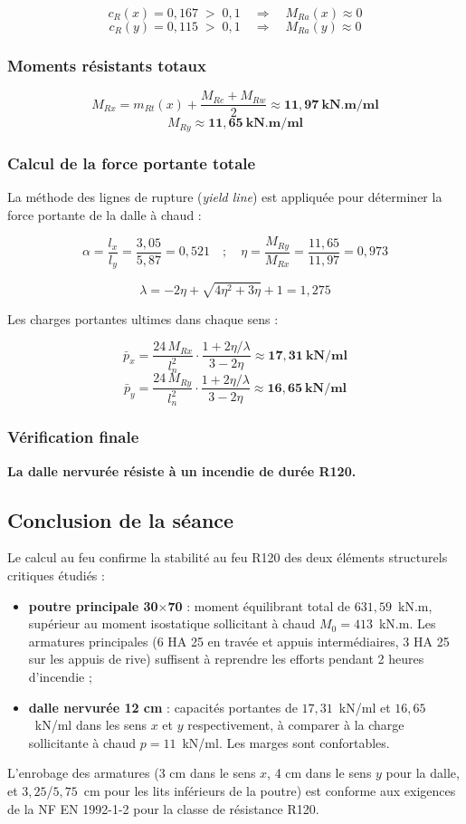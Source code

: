 \[
c_R(x) = 0{,}167 \;>\; 0{,}1 \quad\Longrightarrow\quad M_{Ra}(x) \approx 0
\]
\[
c_R(y) = 0{,}115 \;>\; 0{,}1 \quad\Longrightarrow\quad M_{Ra}(y) \approx 0
\]

\subsubsection{Moments résistants totaux}

\[
M_{Rx} = m_{Rt}(x) + \frac{M_{Re} + M_{Rw}}{2} \approx \mathbf{11{,}97~\text{kN.m/ml}}
\]
\[
M_{Ry} \approx \mathbf{11{,}65~\text{kN.m/ml}}
\]

\subsubsection{Calcul de la force portante totale}

La méthode des lignes de rupture (\textit{yield line}) est appliquée pour déterminer la force portante de la dalle à chaud :

\[
\alpha = \frac{l_x}{l_y} = \frac{3{,}05}{5{,}87} = 0{,}521
\quad ; \quad
\eta = \frac{M_{Ry}}{M_{Rx}} = \frac{11{,}65}{11{,}97} = 0{,}973
\]

\[
\lambda = -2\eta + \sqrt{4\eta^2 + 3\eta} + 1 = 1{,}275
\]

Les charges portantes ultimes dans chaque sens :

\[
\bar{p}_x = \frac{24 \, M_{Rx}}{l_n^2} \cdot \frac{1 + 2\eta/\lambda}{3 - 2\eta} \approx \mathbf{17{,}31~\text{kN/ml}}
\]
\[
\bar{p}_y = \frac{24 \, M_{Ry}}{l_n^2} \cdot \frac{1 + 2\eta/\lambda}{3 - 2\eta} \approx \mathbf{16{,}65~\text{kN/ml}}
\]

\subsubsection{Vérification finale}


\textbf{La dalle nervurée résiste à un incendie de durée R120.}

\subsection{Conclusion de la séance}

Le calcul au feu confirme la stabilité au feu R120 des deux éléments structurels critiques étudiés :
\begin{itemize}
  \item \textbf{poutre principale 30$\times$70} : moment équilibrant total de $631{,}59$~kN.m, supérieur au moment isostatique sollicitant à chaud $M_0 = 413$~kN.m. Les armatures principales (6 HA 25 en travée et appuis intermédiaires, 3 HA 25 sur les appuis de rive) suffisent à reprendre les efforts pendant 2 heures d'incendie ;
  \item \textbf{dalle nervurée 12 cm} : capacités portantes de $17{,}31$~kN/ml et $16{,}65$~kN/ml dans les sens $x$ et $y$ respectivement, à comparer à la charge sollicitante à chaud $p = 11$~kN/ml. Les marges sont confortables.
\end{itemize}

L'enrobage des armatures (3 cm dans le sens $x$, 4 cm dans le sens $y$ pour la dalle, et $3{,}25$/$5{,}75$~cm pour les lits inférieurs de la poutre) est conforme aux exigences de la NF EN 1992-1-2 pour la classe de résistance R120.

